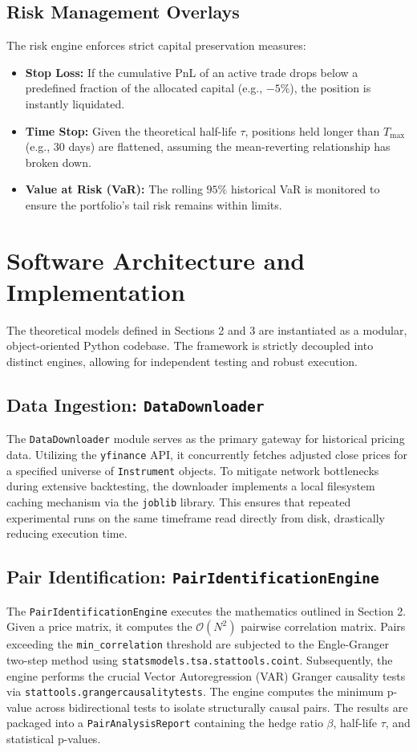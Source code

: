 \documentclass[12pt,a4paper]{article}
\begin{document}
\subsection{Risk Management Overlays}
The risk engine enforces strict capital preservation measures:
\begin{itemize}
    \item \textbf{Stop Loss:} If the cumulative PnL of an active trade drops below a predefined fraction of the allocated capital (e.g., $-5\%$), the position is instantly liquidated.
    \item \textbf{Time Stop:} Given the theoretical half-life $\tau$, positions held longer than $T_{\text{max}}$ (e.g., 30 days) are flattened, assuming the mean-reverting relationship has broken down.
    \item \textbf{Value at Risk (VaR):} The rolling $95\%$ historical VaR is monitored to ensure the portfolio's tail risk remains within limits.
\end{itemize}

\section{Software Architecture and Implementation}
The theoretical models defined in Sections 2 and 3 are instantiated as a modular, object-oriented Python codebase. The framework is strictly decoupled into distinct engines, allowing for independent testing and robust execution.

\subsection{Data Ingestion: \texttt{DataDownloader}}
The \texttt{DataDownloader} module serves as the primary gateway for historical pricing data. Utilizing the \texttt{yfinance} API, it concurrently fetches adjusted close prices for a specified universe of \texttt{Instrument} objects. To mitigate network bottlenecks during extensive backtesting, the downloader implements a local filesystem caching mechanism via the \texttt{joblib} library. This ensures that repeated experimental runs on the same timeframe read directly from disk, drastically reducing execution time.

\subsection{Pair Identification: \texttt{PairIdentificationEngine}}
The \texttt{PairIdentificationEngine} executes the mathematics outlined in Section 2. Given a price matrix, it computes the $\mathcal{O}(N^2)$ pairwise correlation matrix. Pairs exceeding the \texttt{min\_correlation} threshold are subjected to the Engle-Granger two-step method using \texttt{statsmodels.tsa.stattools.coint}. 
Subsequently, the engine performs the crucial Vector Autoregression (VAR) Granger causality tests via \texttt{stattools.grangercausalitytests}. The engine computes the minimum p-value across bidirectional tests to isolate structurally causal pairs. The results are packaged into a \texttt{PairAnalysisReport} containing the hedge ratio $\beta$, half-life $\tau$, and statistical p-values.
\end{document}
